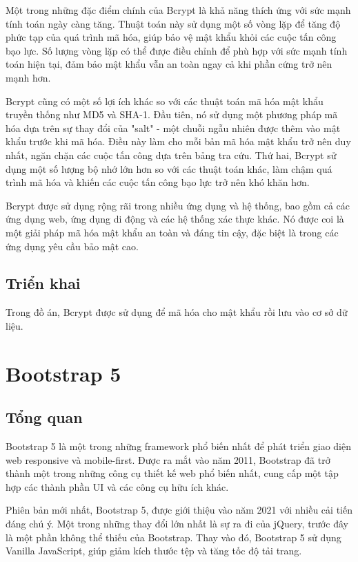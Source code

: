 \documentclass[../DoAn.tex]{subfiles}
\begin{document}
Một trong những đặc điểm chính của Bcrypt là khả năng thích ứng với sức mạnh tính toán ngày càng tăng. Thuật toán này sử dụng một số vòng lặp để tăng độ phức tạp của quá trình mã hóa, giúp bảo vệ mật khẩu khỏi các cuộc tấn công bạo lực. Số lượng vòng lặp có thể được điều chỉnh để phù hợp với sức mạnh tính toán hiện tại, đảm bảo mật khẩu vẫn an toàn ngay cả khi phần cứng trở nên mạnh hơn.

Bcrypt cũng có một số lợi ích khác so với các thuật toán mã hóa mật khẩu truyền thống như MD5 và SHA-1. Đầu tiên, nó sử dụng một phương pháp mã hóa dựa trên sự thay đổi của "salt" - một chuỗi ngẫu nhiên được thêm vào mật khẩu trước khi mã hóa. Điều này làm cho mỗi bản mã hóa mật khẩu trở nên duy nhất, ngăn chặn các cuộc tấn công dựa trên bảng tra cứu. Thứ hai, Bcrypt sử dụng một số lượng bộ nhớ lớn hơn so với các thuật toán khác, làm chậm quá trình mã hóa và khiến các cuộc tấn công bạo lực trở nên khó khăn hơn.

Bcrypt được sử dụng rộng rãi trong nhiều ứng dụng và hệ thống, bao gồm cả các ứng dụng web, ứng dụng di động và các hệ thống xác thực khác. Nó được coi là một giải pháp mã hóa mật khẩu an toàn và đáng tin cậy, đặc biệt là trong các ứng dụng yêu cầu bảo mật cao.

\subsection{Triển khai}
\label{subsection:3.6.2}
Trong đồ án, Bcrypt được sử dụng để mã hóa cho mật khẩu rồi lưu vào cơ sở dữ liệu.

\section{Bootstrap 5}
\label{section:3.7}
\subsection{Tổng quan}
\label{subsection:3.7.1}
Bootstrap 5 là một trong những framework phổ biến nhất để phát triển giao diện web responsive và mobile-first. Được ra mắt vào năm 2011, Bootstrap đã trở thành một trong những công cụ thiết kế web phổ biến nhất, cung cấp một tập hợp các thành phần UI và các công cụ hữu ích khác.

Phiên bản mới nhất, Bootstrap 5, được giới thiệu vào năm 2021 với nhiều cải tiến đáng chú ý. Một trong những thay đổi lớn nhất là sự ra đi của jQuery, trước đây là một phần không thể thiếu của Bootstrap. Thay vào đó, Bootstrap 5 sử dụng Vanilla JavaScript, giúp giảm kích thước tệp và tăng tốc độ tải trang.
\end{document}
